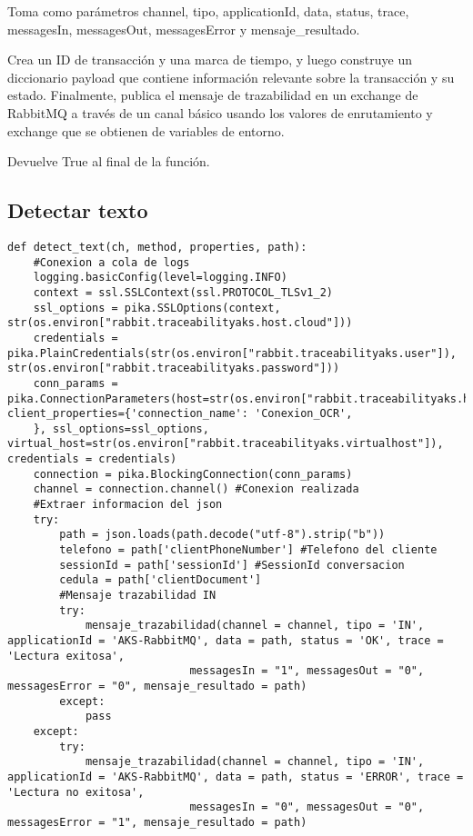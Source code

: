 \documentclass{article}
\begin{document}
Toma como parámetros channel, tipo, applicationId, data, status, trace, messagesIn, messagesOut, messagesError y mensaje\_resultado.

Crea un ID de transacción y una marca de tiempo, y luego construye un diccionario payload que contiene información relevante sobre la transacción y su estado. Finalmente, publica el mensaje de trazabilidad en un exchange de RabbitMQ a través de un canal básico usando los valores de enrutamiento y exchange que se obtienen de variables de entorno.

Devuelve True al final de la función.

\subsection{Detectar texto}
\begin{lstlisting}
def detect_text(ch, method, properties, path):
    #Conexion a cola de logs
    logging.basicConfig(level=logging.INFO)
    context = ssl.SSLContext(ssl.PROTOCOL_TLSv1_2)
    ssl_options = pika.SSLOptions(context, str(os.environ["rabbit.traceabilityaks.host.cloud"]))
    credentials = pika.PlainCredentials(str(os.environ["rabbit.traceabilityaks.user"]), str(os.environ["rabbit.traceabilityaks.password"]))
    conn_params = pika.ConnectionParameters(host=str(os.environ["rabbit.traceabilityaks.host.cloud"]),port=str(os.environ["rabbit.traceabilityaks.port"]), client_properties={'connection_name': 'Conexion_OCR',
    }, ssl_options=ssl_options, virtual_host=str(os.environ["rabbit.traceabilityaks.virtualhost"]), credentials = credentials)
    connection = pika.BlockingConnection(conn_params)
    channel = connection.channel() #Conexion realizada
    #Extraer informacion del json
    try:
        path = json.loads(path.decode("utf-8").strip("b"))
        telefono = path['clientPhoneNumber'] #Telefono del cliente
        sessionId = path['sessionId'] #SessionId conversacion
        cedula = path['clientDocument'] 
        #Mensaje trazabilidad IN 
        try:
            mensaje_trazabilidad(channel = channel, tipo = 'IN', applicationId = 'AKS-RabbitMQ', data = path, status = 'OK', trace = 'Lectura exitosa',
                            messagesIn = "1", messagesOut = "0", messagesError = "0", mensaje_resultado = path)
        except:
            pass
    except:
        try:
            mensaje_trazabilidad(channel = channel, tipo = 'IN', applicationId = 'AKS-RabbitMQ', data = path, status = 'ERROR', trace = 'Lectura no exitosa',
                            messagesIn = "0", messagesOut = "0", messagesError = "1", mensaje_resultado = path)

\end{lstlisting}
\end{document}

